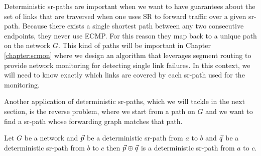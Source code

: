 Deterministic sr-paths are important when we want to have guarantees about the set of links that are traversed
when one uses SR to forward traffic over a given sr-path. Because there exists a single shortest path between any two consecutive endpoints,
they never use ECMP. For this reason they map back to a unique path on the network $G$. This kind of paths will be important in Chapter \ref{chapter:scmon}
where we design an algorithm that leverages segment routing to provide network monitoring for detecting single link failures. In this context,
we will need to know exactly which links are covered by each sr-path used for the monitoring.

Another application of deterministic sr-paths, which we will tackle in the next section, is the reverse problem, where we start from a path on $G$
and we want to find a sr-path whose forwarding graph matches that path.

\begin{lemma}
\label{lemma:deterministic-concat}
Let $G$ be a network and $\vec{p}$ be a deterministic sr-path from
$a$ to $b$ and $\vec{q}$ be a deterministic sr-path from $b$ to $c$ 
then $\vec{p} \oplus \vec{q}$ is a deterministic sr-path
from $a$ to $c$.
\end{lemma}

